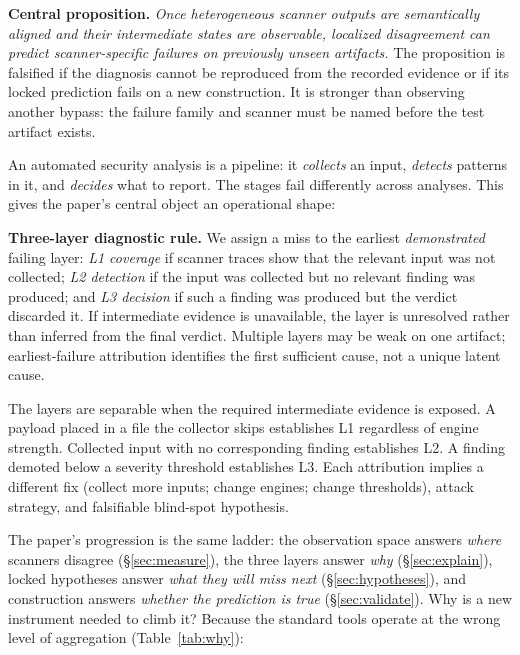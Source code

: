 \documentclass[sigconf,nonacm]{acmart}
\begin{document}
\noindent\textbf{Central proposition.} \emph{Once heterogeneous scanner outputs are semantically aligned and their intermediate states are observable, localized disagreement can predict scanner-specific failures on previously unseen artifacts.} The proposition is falsified if the diagnosis cannot be reproduced from the recorded evidence or if its locked prediction fails on a new construction. It is stronger than observing another bypass: the failure family and scanner must be named before the test artifact exists.

An automated security analysis is a pipeline: it \emph{collects} an input, \emph{detects} patterns in it, and \emph{decides} what to report. The stages fail differently across analyses. This gives the paper's central object an operational shape:

\noindent\textbf{Three-layer diagnostic rule.} We assign a miss to the earliest \emph{demonstrated} failing layer: \emph{L1 coverage} if scanner traces show that the relevant input was not collected; \emph{L2 detection} if the input was collected but no relevant finding was produced; and \emph{L3 decision} if such a finding was produced but the verdict discarded it. If intermediate evidence is unavailable, the layer is unresolved rather than inferred from the final verdict. Multiple layers may be weak on one artifact; earliest-failure attribution identifies the first sufficient cause, not a unique latent cause.

The layers are separable when the required intermediate evidence is exposed. A payload placed in a file the collector skips establishes L1 regardless of engine strength. Collected input with no corresponding finding establishes L2. A finding demoted below a severity threshold establishes L3. Each attribution implies a different fix (collect more inputs; change engines; change thresholds), attack strategy, and falsifiable blind-spot hypothesis.

The paper's progression is the same ladder: the observation space answers \emph{where} scanners disagree (\S\ref{sec:measure}), the three layers answer \emph{why} (\S\ref{sec:explain}), locked hypotheses answer \emph{what they will miss next} (\S\ref{sec:hypotheses}), and construction answers \emph{whether the prediction is true} (\S\ref{sec:validate}). Why is a new instrument needed to climb it? Because the standard tools operate at the wrong level of aggregation (Table~\ref{tab:why}):
\end{document}

